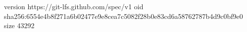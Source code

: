 version https://git-lfs.github.com/spec/v1
oid sha256:6554e4b8f271a6b02477e9e8cea7c5082f28b0e83cd6a58762787b4d9c0bf9e0
size 43292
